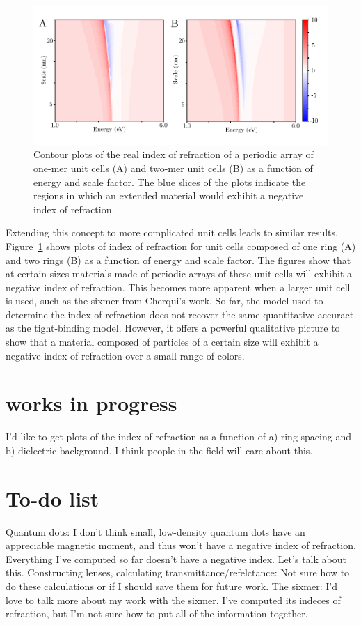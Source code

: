 \documentclass[journal=apchd5,manuscript=article]{achemso}
\begin{document}
\begin{figure}
\begin{center}
\includegraphics{contour_n_plot.pdf}
\caption{Contour plots of the real index of refraction of a periodic array of one-mer unit cells (A) and two-mer unit cells (B) as a function of energy and scale factor. The blue slices of the plots indicate the regions in which an extended material would exhibit a negative index of refraction.}
\label{onemer_twomer_n}
\end{center}
\end{figure}

Extending this concept to more complicated unit cells leads to similar results. Figure~\ref{onemer_twomer_n} shows plots of index of refraction for unit cells composed of one ring (A) and two rings (B) as a function of energy and scale factor. The figures show that at certain sizes materials made of periodic arrays of these unit cells will exhibit a negative index of refraction. This becomes more apparent when a larger unit cell is used, such as the sixmer from Cherqui's work\cite{Cherqui2014}. So far, the model used to determine the index of refraction does not recover the same quantitative accuract as the tight-binding model. However, it offers a powerful qualitative picture to show that a material composed of particles of a certain size will exhibit a negative index of refraction over a small range of colors.

\section{works in progress}
I'd like to get plots of the index of refraction as a function of a) ring spacing and b) dielectric background. I think people in the field will care about this.
\section{To-do list}
Quantum dots: I don't think small, low-density quantum dots have an appreciable magnetic moment, and thus won't have a negative index of refraction. Everything I've computed so far doesn't have a negative index. Let's talk about this.
Constructing lenses, calculating transmittance/refelctance: Not sure how to do these calculations or if I should save them for future work.
The sixmer: I'd love to talk more about my work with the sixmer. I've computed its indeces of refraction, but I'm not sure how to put all of the information together.
\end{document}

